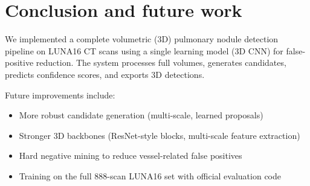 \section{Conclusion and future work}
We implemented a complete volumetric (3D) pulmonary nodule detection pipeline on LUNA16 CT scans using a single learning model (3D CNN) for false-positive reduction. The system processes full volumes, generates candidates, predicts confidence scores, and exports 3D detections.

Future improvements include:
\begin{itemize}
  \item More robust candidate generation (multi-scale, learned proposals)
  \item Stronger 3D backbones (ResNet-style blocks, multi-scale feature extraction)
  \item Hard negative mining to reduce vessel-related false positives
  \item Training on the full 888-scan LUNA16 set with official evaluation code
\end{itemize}